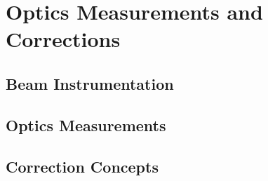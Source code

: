 \chapter{Optics Measurements and Corrections}

\section{Beam Instrumentation}

\section{Optics Measurements}


\section{Correction Concepts}